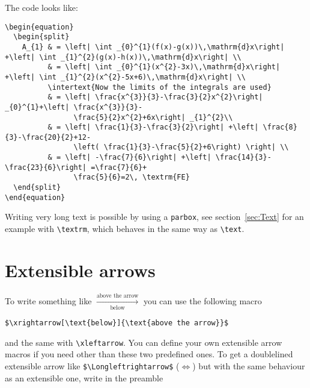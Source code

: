 \begin{table}[htb]
The code looks like:\\


\begin{lstlisting}[xleftmargin=-1cm,xrightmargin=-1.5cm]
\begin{equation}
  \begin{split}
    A_{1} & = \left| \int _{0}^{1}(f(x)-g(x))\,\mathrm{d}x\right| +\left| \int _{1}^{2}(g(x)-h(x))\,\mathrm{d}x\right| \\
          & = \left| \int _{0}^{1}(x^{2}-3x)\,\mathrm{d}x\right| +\left| \int _{1}^{2}(x^{2}-5x+6)\,\mathrm{d}x\right| \\
          \intertext{Now the limits of the integrals are used}
          & = \left| \frac{x^{3}}{3}-\frac{3}{2}x^{2}\right| _{0}^{1}+\left| \frac{x^{3}}{3}-
                \frac{5}{2}x^{2}+6x\right| _{1}^{2}\\
          & = \left| \frac{1}{3}-\frac{3}{2}\right| +\left| \frac{8}{3}-\frac{20}{2}+12-
                \left( \frac{1}{3}-\frac{5}{2}+6\right) \right| \\
          & = \left| -\frac{7}{6}\right| +\left| \frac{14}{3}-\frac{23}{6}\right| =\frac{7}{6}+
                \frac{5}{6}=2\, \textrm{FE}
  \end{split}
\end{equation}
\end{lstlisting}

Writing very long text is possible by using a \verb+parbox+, see section~\vref{sec:Text} for    %
an example with \verb+\textrm+, which behaves in the same way as \verb+\text+.




\section{Extensible arrows}
To write something like $\xrightarrow[\text{below}]{\text{above the arrow}}$ you can use the following macro

\begin{verbatim}
$\xrightarrow[\text{below}]{\text{above the arrow}}$
\end{verbatim}

\noindent and the same with \verb|\xleftarrow|. You can define your own extensible arrow macros
if you need other than these two predefined ones. To get a doublelined extensible
arrow like \verb|$\Longleftrightarrow$| ($\Longleftrightarrow$) but with the same
behaviour as an extensible one, write in the preamble    %


\end{table}
